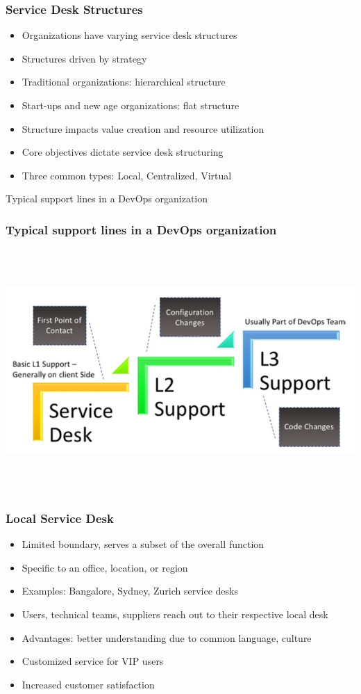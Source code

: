 \documentclass[aspectratio=169, table]{beamer}
\begin{document}
\begin{frame}
	\frametitle{Service Desk Structures}
	\begin{itemize}
		\item Organizations have varying service desk structures
		\item Structures driven by strategy
		\item Traditional organizations: hierarchical structure
		\item Start-ups and new age organizations: flat structure
		\item Structure impacts value creation and resource utilization
		\item Core objectives dictate service desk structuring
		\item Three common types: Local, Centralized, Virtual
	\end{itemize}
\end{frame}

\begin{frame}{Typical support lines in a DevOps organization} 	 \frametitle{Typical support lines in a DevOps organization} \begin{center} 	\includegraphics[width=0.8\linewidth]{images/image-01.png} \end{center} \end{frame}

\begin{frame}
	\frametitle{Local Service Desk}
	\begin{itemize}
		\item Limited boundary, serves a subset of the overall function
		\item Specific to an office, location, or region
		\item Examples: Bangalore, Sydney, Zurich service desks
		\item Users, technical teams, suppliers reach out to their respective local desk
		\item Advantages: better understanding due to common language, culture
		\item Customized service for VIP users
		\item Increased customer satisfaction
	\end{itemize}
\end{frame}
\end{document}
